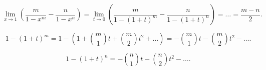 \begin{enumerate}
    \begin{equation*}
        \lim_{x \to 1} \left( \frac{m}{1 - x^m} - \frac{n}{1 - x^n} \right) 
        = \lim_{t \to 0} \left( \frac{m}{1 - (1 + t)^m} - \frac{n}{1 - (1 + t)^n} \right)
        = \dots
        = \frac{m - n}{2}
    .\end{equation*}

    \begin{equation*}
        1 - (1 + t)^m = 1 - \left(1 + \binom{m}{1}t + \binom{m}{2}t^2 + \dots \right)
        = - \binom{m}{1}t - \binom{m}{2} t^2 - \dots
    .\end{equation*}

    \begin{equation*}
        1 - (1 + t)^n = -\binom{n}{1} t - \binom{n}{2} t^2 - \dots
    .\end{equation*}
\end{enumerate}
